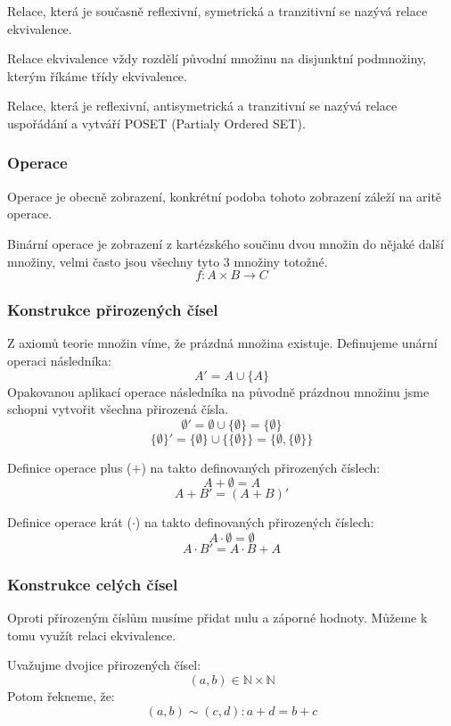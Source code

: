 \begin{definition}
	Relace, která je současně reflexivní, symetrická a
	tranzitivní se nazývá relace ekvivalence.

	Relace ekvivalence vždy rozdělí původní množinu na disjunktní podmnožiny,
	kterým říkáme třídy ekvivalence.
\end{definition}

\begin{definition}
	Relace, která je reflexivní, antisymetrická a tranzitivní se nazývá
	relace uspořádání a vytváří POSET (Partialy Ordered SET).
\end{definition}


\subsubsection*{Operace}
Operace je obecně zobrazení, konkrétní podoba tohoto zobrazení záleží na aritě operace.

Binární operace je zobrazení z kartézského součinu dvou množin do nějaké další množiny, velmi často
jsou všechny tyto 3 množiny totožné.
$$f: A \times B \rightarrow C$$

\subsubsection*{Konstrukce přirozených čísel}
Z axiomů teorie množin víme, že prázdná množina existuje. Definujeme unární operaci
následníka:
$$A' = A \cup \{A\}$$
Opakovanou aplikací operace následníka na původně prázdnou množinu jsme schopni vytvořit
všechna přirozená čísla.
$$\emptyset' = \emptyset \cup \{\emptyset\} = \{\emptyset\}$$
$$\{\emptyset\}' = \{\emptyset\} \cup \{\{\emptyset\}\} = \{\emptyset, \{\emptyset\}\}$$

Definice operace plus ($+$) na takto definovaných přirozených číslech:
$$A + \emptyset = A$$
$$A + B' = (A+B)'$$

Definice operace krát ($\cdot$) na takto definovaných přirozených číslech:
$$A \cdot \emptyset = \emptyset$$
$$A \cdot B' = A \cdot B + A$$

\subsubsection*{Konstrukce celých čísel}
Oproti přirozeným číslům musíme přidat nulu a záporné hodnoty. Můžeme k tomu
využít relaci ekvivalence.

Uvažujme dvojice přirozených čísel:
$$(a, b) \in \mathbb{N} \times \mathbb{N}$$
Potom řekneme, že:
$$(a, b) \sim (c, d): a + d = b + c$$

